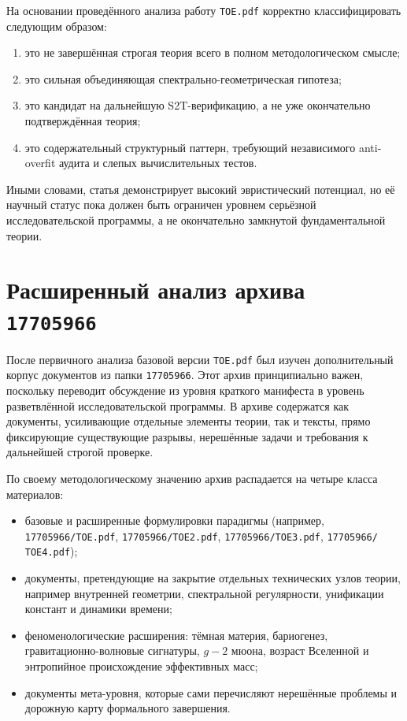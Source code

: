 \documentclass[12pt,a4paper]{article}
\begin{document}
На основании проведённого анализа работу \texttt{TOE.pdf} корректно классифицировать следующим образом:
\begin{enumerate}
    \item это не завершённая строгая теория всего в полном методологическом смысле;
    \item это сильная объединяющая спектрально-геометрическая гипотеза;
    \item это кандидат на дальнейшую S2T-верификацию, а не уже окончательно подтверждённая теория;
    \item это содержательный структурный паттерн, требующий независимого anti-overfit аудита и слепых вычислительных тестов.
\end{enumerate}

Иными словами, статья демонстрирует высокий эвристический потенциал, но её научный статус пока должен быть ограничен уровнем серьёзной исследовательской программы, а не окончательно замкнутой фундаментальной теории.


\section{Расширенный анализ архива \texttt{17705966}}

После первичного анализа базовой версии \texttt{TOE.pdf} был изучен дополнительный корпус документов из папки \texttt{17705966}. Этот архив принципиально важен, поскольку переводит обсуждение из уровня краткого манифеста в уровень разветвлённой исследовательской программы. В архиве содержатся как документы, усиливающие отдельные элементы теории, так и тексты, прямо фиксирующие существующие разрывы, нерешённые задачи и требования к дальнейшей строгой проверке.

По своему методологическому значению архив распадается на четыре класса материалов:
\begin{itemize}
    \item базовые и расширенные формулировки парадигмы (например, \texttt{17705966/TOE.pdf}, \texttt{17705966/ТОЕ2.pdf}, \texttt{17705966/ТОЕ3.pdf}, \texttt{17705966/ТОЕ4.pdf});
    \item документы, претендующие на закрытие отдельных технических узлов теории, например внутренней геометрии, спектральной регулярности, унификации констант и динамики времени;
    \item феноменологические расширения: тёмная материя, бариогенез, гравитационно-волновые сигнатуры, \(g-2\) мюона, возраст Вселенной и энтропийное происхождение эффективных масс;
    \item документы мета-уровня, которые сами перечисляют нерешённые проблемы и дорожную карту формального завершения.
\end{itemize}
\end{document}

